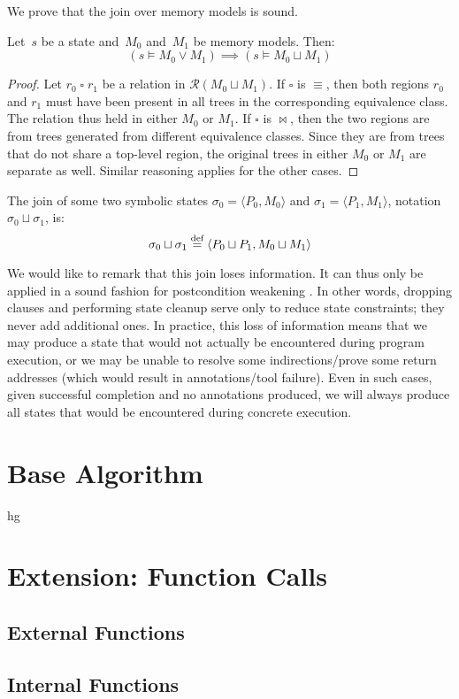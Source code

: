 We prove that the join over memory models is sound.
\begin{lemma}\label{lem:mem_soundness}
  Let~$s$ be a state and~$M_0$ and~$M_1$ be memory models. Then:
  \begin{equation*}
    (s\models M_0 \vee M_1) \implies (s\models M_0\sqcup M_1)
  \end{equation*}
\end{lemma}
\begin{proof}
  Let $r_0\mathbin{\square}r_1$ be a relation in $\mathcal{R}(M_0 \sqcup M_1)$.
  If $\square$ is $\equiv$, then both regions $r_0$ and $r_1$ must have been present in all trees in the corresponding equivalence class.
  The relation thus held in either $M_0$ or $M_1$.
  If $\square$ is $\bowtie$, then the two regions are from trees generated from different equivalence classes. Since they are from trees that do not share a top-level region, the original trees in either $M_0$ or $M_1$ are separate as well.
  Similar reasoning applies for the other cases.
\end{proof}


\begin{definition}
  The join of some two symbolic states $\sigma_0=\langle P_0,M_0\rangle$
  and $\sigma_1=\langle P_1,M_1\rangle$, notation $\sigma_0 \sqcup \sigma_1$, is:
  \begin{equation*}
    \sigma_0 \sqcup \sigma_1 \stackrel{\text{def}}{=} \langle P_0\sqcup P_1,M_0\sqcup M_1\rangle
  \end{equation*}
\end{definition}

We would like to remark that this join loses information.
It can thus only be applied in a sound fashion for postcondition weakening \autocite{hoare1969axiomatic}.
In other words, dropping clauses and performing state cleanup
serve only to reduce state constraints; they never add additional ones.
In practice, this loss of information means that we may produce a state
that would not actually be encountered during program execution,
or we may be unable to resolve some indirections/prove some return addresses
(which would result in annotations/tool failure).
Even in such cases, given successful completion and no annotations produced,
we will always produce all states that would be encountered during concrete execution.

\section{Base Algorithm}
\Ac{hg}

\section{Extension: Function Calls}

\subsection{External Functions}

\subsection{Internal Functions}
